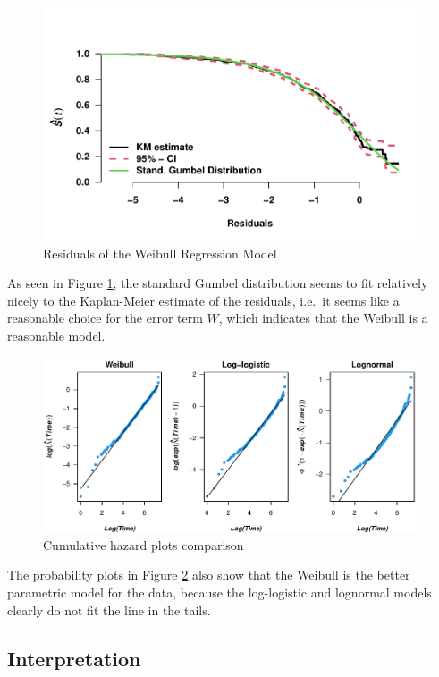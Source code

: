 \documentclass[
]{article}
\begin{document}
\begin{figure}

{\centering \includegraphics[width=0.7\linewidth]{practical_files/figure-latex/weibull-resids-1} 

}

\caption{Residuals of the Weibull Regression Model}\label{fig:weibull-resids}
\end{figure}

As seen in Figure \ref{fig:weibull-resids}, the standard Gumbel distribution seems to fit relatively nicely to the Kaplan-Meier estimate of the residuals, i.e.~it seems like a reasonable choice for the error term \(W\), which indicates that the Weibull is a reasonable model.

\begin{figure}
\centering
\includegraphics{practical_files/figure-latex/cumhaz-plot-1.pdf}
\caption{\label{fig:cumhaz-plot}Cumulative hazard plots comparison}
\end{figure}

The probability plots in Figure \ref{fig:cumhaz-plot} also show that the Weibull is the better parametric model for the data, because the log-logistic and lognormal models clearly do not fit the line in the tails.

\hypertarget{interpretation}{%
\subsection{Interpretation}\label{interpretation}}
\end{document}
